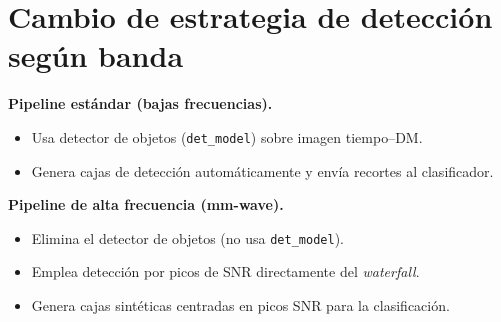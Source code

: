 \section{Cambio de estrategia de detección según banda}
\textbf{Pipeline estándar (bajas frecuencias).} 
\begin{itemize}
  \item Usa detector de objetos (\texttt{det\_model}) sobre imagen tiempo--DM.
  \item Genera cajas de detección automáticamente y envía recortes al clasificador.
\end{itemize}
\textbf{Pipeline de alta frecuencia (mm-wave).}
\begin{itemize}
  \item Elimina el detector de objetos (no usa \texttt{det\_model}).
  \item Emplea detección por picos de SNR directamente del \textit{waterfall}.
  \item Genera cajas sintéticas centradas en picos SNR para la clasificación.
\end{itemize}


